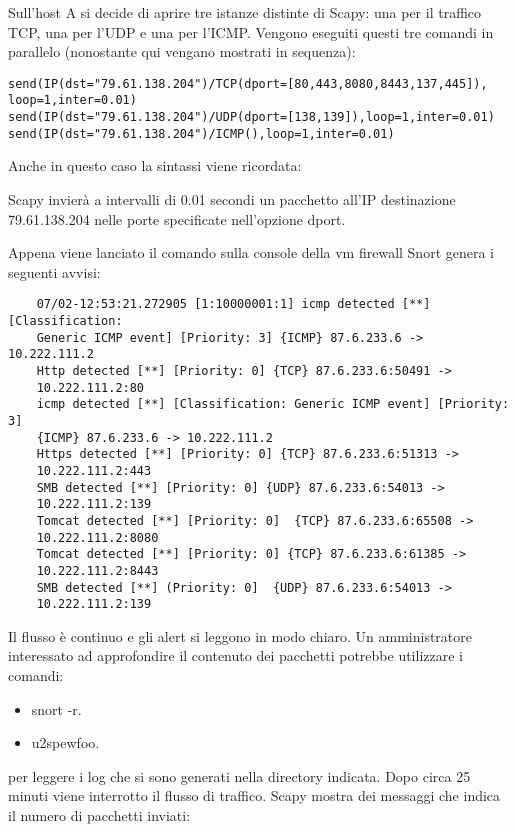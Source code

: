Sull'host A si decide di aprire tre istanze distinte di Scapy: una per il traffico TCP, una per l'UDP e una per l'ICMP. Vengono eseguiti questi tre comandi in parallelo (nonostante qui vengano mostrati in sequenza):

\begin{verbatim}
send(IP(dst="79.61.138.204")/TCP(dport=[80,443,8080,8443,137,445]),
loop=1,inter=0.01)
send(IP(dst="79.61.138.204")/UDP(dport=[138,139]),loop=1,inter=0.01)
send(IP(dst="79.61.138.204")/ICMP(),loop=1,inter=0.01)
\end{verbatim}

Anche in questo caso la sintassi viene ricordata:

Scapy invierà a intervalli di 0.01 secondi un pacchetto all'IP destinazione 79.61.138.204 nelle porte specificate nell'opzione dport.

Appena viene lanciato il comando sulla console della vm firewall Snort genera i seguenti avvisi:

\begin{verbatim}
    07/02-12:53:21.272905 [1:10000001:1] icmp detected [**] [Classification:
    Generic ICMP event] [Priority: 3] {ICMP} 87.6.233.6 -> 10.222.111.2
    Http detected [**] [Priority: 0] {TCP} 87.6.233.6:50491 -> 
    10.222.111.2:80
    icmp detected [**] [Classification: Generic ICMP event] [Priority: 3] 
    {ICMP} 87.6.233.6 -> 10.222.111.2
    Https detected [**] [Priority: 0] {TCP} 87.6.233.6:51313 -> 
    10.222.111.2:443
    SMB detected [**] [Priority: 0] {UDP} 87.6.233.6:54013 -> 
    10.222.111.2:139
    Tomcat detected [**] [Priority: 0]  {TCP} 87.6.233.6:65508 ->
    10.222.111.2:8080
    Tomcat detected [**] [Priority: 0] {TCP} 87.6.233.6:61385 ->
    10.222.111.2:8443
    SMB detected [**] (Priority: 0]  {UDP} 87.6.233.6:54013 -> 
    10.222.111.2:139
\end{verbatim}

Il flusso è continuo e gli alert si leggono in modo chiaro.
Un amministratore interessato ad approfondire il contenuto dei pacchetti potrebbe utilizzare i comandi:
\begin{itemize}
    \item snort -r.
    \item u2spewfoo.
\end{itemize}

per leggere i log che si sono generati nella directory indicata.
Dopo circa 25 minuti viene interrotto il flusso di traffico. Scapy mostra dei messaggi che indica il numero di pacchetti inviati:


